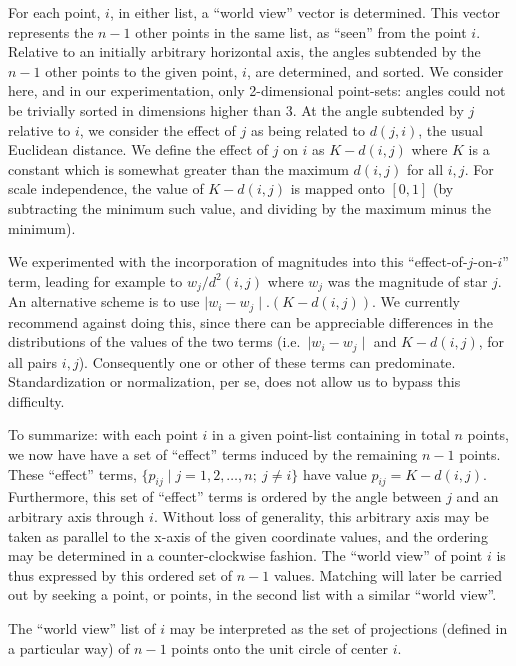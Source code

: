 For each point, $i$,  in either list, a ``world view'' vector is determined.
This vector represents the $n-1$ other points in the same
list, as ``seen'' from the point $i$.  Relative to an initially arbitrary
horizontal axis, the angles subtended by the $n-1$ other points to the
given point, $i$, are determined, and sorted.  We consider here, and in
our experimentation, only 2-dimensional point-sets: angles could not be
trivially sorted in dimensions higher than 3. At the angle subtended by
$j$ relative to $i$, we consider the effect of $j$ as being related to
$d(j,i)$, the usual Euclidean distance.  
We define the effect of $j$ on $i$ as
$K - d(i,j)$ where $K$ is a constant which is somewhat greater than
the maximum $d(i,j)$ for all $i,j$.  For scale independence, the value
of $K - d(i,j)$ is mapped onto $[0, 1]$ (by subtracting the minimum such 
value, and dividing by the maximum minus the minimum).

We experimented with the incorporation of 
magnitudes into this ``effect-of-$j$-on-$i$'' term, 
leading for example to $w_j/d^2(i,j)$ where
$w_j$ was the magnitude of star $j$.  An alternative scheme is to use
$\mid w_i - w_j \mid . (K - d(i,j))$.  We  currently recommend against doing
this, since there can be appreciable differences in the 
distributions of the values of the two terms (i.e.\ 
$\mid w_i - w_j \mid$ and $K - d(i,j)$, for all pairs $i, j$).
Consequently one or other
of these terms can predominate.  Standardization or normalization, per se, does
not allow us to bypass this difficulty.

To summarize: with each point $i$ in a given point-list containing in total
$n$ points, we now have have a set of ``effect'' terms induced by the 
remaining $n-1$ points.  These ``effect'' terms, $ \{ p_{ij} \mid j = 1, 2, 
\dots, n; \ 
j \neq i \}$ have value $p_{ij} = K - d(i,j)$.  Furthermore, this set of
``effect'' terms is 
ordered by the angle between  $j$ and an arbitrary axis through $i$.  Without
loss of generality, this arbitrary axis may be taken as parallel to the
x-axis of the given coordinate values, and the ordering may be determined
in a counter-clockwise fashion.  The ``world view'' of point $i$ is thus
expressed by this ordered set of $n-1$ values.  Matching will later be
carried out by seeking a point, or points, in the second list with a similar
``world view''.

The ``world view'' list of $i$ may be interpreted as the set of projections
(defined in a particular way) of $n-1$ points onto the unit circle of center
$i$.

